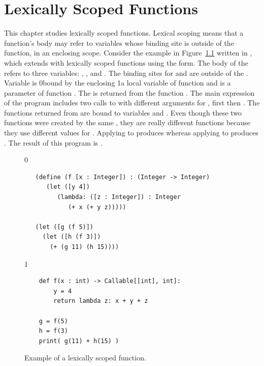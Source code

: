 \documentclass[7x10,nocrop]{TimesAPriori_MIT}%
\def\racketEd{0}
\def\pythonEd{1}
\def\edition{0}
\newcommand{\racket}[1]{{\if\edition\racketEd{#1}\fi}}
\newcommand{\python}[1]{{\if\edition\pythonEd #1\fi}}
\begin{document}




\chapter{Lexically Scoped Functions}
\label{ch:Llambda}

This chapter studies lexically scoped functions. Lexical scoping means
that a function's body may refer to variables whose binding site is
outside of the function, in an enclosing scope.
%
Consider the example in Figure~\ref{fig:lexical-scoping} written in
\LangLam{}, which extends \LangFun{} with lexically scoped functions
using the  form.  The body of the  refers to
three variables: , , and . The binding sites
for  and  are outside of the . Variable
 is \racket{bound by the enclosing }\python{a local
  variable of function } and  is a parameter of
function . The  is returned from the function
. The main expression of the program includes two calls to
 with different arguments for , first  then
. The functions returned from  are bound to variables
 and . Even though these two functions were created by
the same , they are really different functions because
they use different values for . Applying  to 
produces  whereas applying  to  produces
. The result of this program is .

\begin{figure}[btp]
{\if\edition\racketEd
\begin{lstlisting}
   (define (f [x : Integer]) : (Integer -> Integer)
      (let ([y 4])
         (lambda: ([z : Integer]) : Integer
            (+ x (+ y z)))))

   (let ([g (f 5)])
     (let ([h (f 3)])
       (+ (g 11) (h 15))))
\end{lstlisting}
\fi}
{\if\edition\pythonEd
\begin{lstlisting}
    def f(x : int) -> Callable[[int], int]:
        y = 4
        return lambda z: x + y + z

    g = f(5)
    h = f(3)
    print( g(11) + h(15) )
\end{lstlisting}
\fi}
\caption{Example of a lexically scoped function.}
\label{fig:lexical-scoping}
\end{figure}
\end{document}
